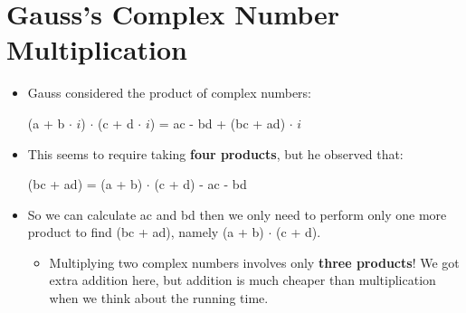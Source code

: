 \documentclass[12pt]{article}
\begin{document}
\section{Gauss's Complex Number Multiplication}
\renewcommand{\labelitemii}{$\circ$}
\renewcommand{\labelitemiii}{$\cdot$}
\renewcommand{\labelitemiii}{$\rightarrow$}
\begin{itemize}
\item Gauss considered the product of complex numbers: 
\begin{center}
 (a + b $\cdot$ $i$) $\cdot$ (c + d $\cdot$ $i$) = ac - bd + (bc + ad) $\cdot$ $i$  
 \end{center}
 \item This seems to require taking \textbf{four products}, but he observed that:
 \begin{center}
 (bc + ad) = (a + b) $\cdot$ (c + d) - ac - bd
\end{center}
\item So we can calculate ac and bd then we only need to perform only one more product to find (bc + ad), namely (a + b) $\cdot$ (c + d).
	\begin{itemize}
	\item Multiplying two complex numbers involves only \textbf{three products}! We got extra addition here, but addition is much cheaper than multiplication when we think about the running time.
	\end{itemize}
\end{itemize}
\end{document}

